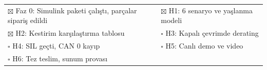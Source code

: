 \documentclass[11pt,a4paper]{article}
\begin{document}
\vspace{6pt}
\begin{kontrol}
\begin{tabular}{@{}ll@{}}
$\boxtimes$ Faz 0: Simulink paketi çalıştı, parçalar sipariş edildi &
$\boxtimes$ H1: 6 senaryo ve yaşlanma modeli \\
$\boxtimes$ H2: Kestirim karşılaştırma tablosu &
$\square$ H3: Kapalı çevrimde derating \\
$\square$ H4: SIL geçti, CAN 0 kayıp &
$\square$ H5: Canlı demo ve video \\
$\square$ H6: Tez teslim, sunum provası & \\
\end{tabular}
\end{kontrol}
\end{document}
